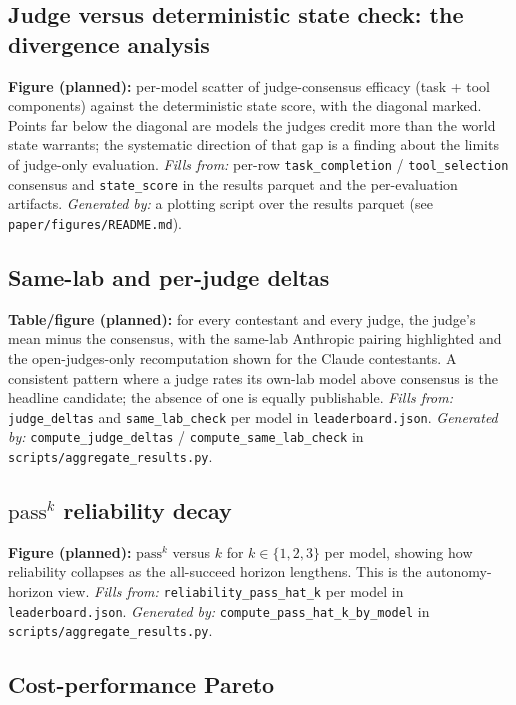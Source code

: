 \subsection{Judge versus deterministic state check: the divergence analysis}

\textbf{Figure (planned):} per-model scatter of judge-consensus efficacy (task +
tool components) against the deterministic state score, with the diagonal marked.
Points far below the diagonal are models the judges credit more than the world
state warrants; the systematic direction of that gap is a finding about the limits
of judge-only evaluation. \emph{Fills from:} per-row \texttt{task\_completion} /
\texttt{tool\_selection} consensus and \texttt{state\_score} in the results parquet
and the per-evaluation artifacts. \emph{Generated by:} a plotting script over the
results parquet (see \texttt{paper/figures/README.md}).

\subsection{Same-lab and per-judge deltas}

\textbf{Table/figure (planned):} for every contestant and every judge, the judge's
mean minus the consensus, with the same-lab Anthropic pairing highlighted and the
open-judges-only recomputation shown for the Claude contestants. A consistent
pattern where a judge rates its own-lab model above consensus is the headline
candidate; the absence of one is equally publishable. \emph{Fills from:}
\texttt{judge\_deltas} and \texttt{same\_lab\_check} per model in
\texttt{leaderboard.json}. \emph{Generated by:}
\texttt{compute\_judge\_deltas} / \texttt{compute\_same\_lab\_check} in
\texttt{scripts/aggregate\_results.py}.

\subsection{$\text{pass}^k$ reliability decay}

\textbf{Figure (planned):} $\text{pass}^k$ versus $k$ for $k \in \{1,2,3\}$ per
model, showing how reliability collapses as the all-succeed horizon lengthens. This
is the autonomy-horizon view. \emph{Fills from:}
\texttt{reliability\_pass\_hat\_k} per model in \texttt{leaderboard.json}.
\emph{Generated by:} \texttt{compute\_pass\_hat\_k\_by\_model} in
\texttt{scripts/aggregate\_results.py}.

\subsection{Cost-performance Pareto}


